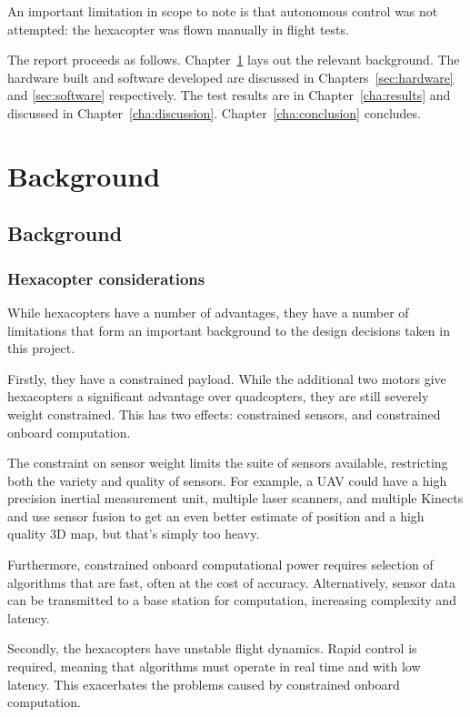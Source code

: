 \documentclass[12pt,oneside,a4paper,draft]{book}
\begin{document}
An important limitation in scope to note is that autonomous control
was not attempted: the hexacopter was flown manually in flight tests.

The report proceeds as follows. 
Chapter~\ref{cha:background} lays out the relevant background. The
hardware built and software developed are discussed in
Chapters~\ref{sec:hardware} and \ref{sec:software} respectively. The
test results are in Chapter~\ref{cha:results} and discussed in
Chapter~\ref{cha:discussion}. Chapter~\ref{cha:conclusion} concludes.

\part{Background}
\chapter{Background}
\label{cha:background}

\section{Hexacopter considerations}
\label{sec:hexac-cons}

While hexacopters have a number of advantages, they have a number of
limitations that form an important background to the design decisions
taken in this project.

Firstly, they have a constrained payload. While the additional two
motors give hexacopters a significant advantage over quadcopters, they
are still severely weight constrained. This has two effects:
constrained sensors, and constrained onboard computation.

The constraint on sensor weight limits the suite of sensors available,
restricting both the variety and quality of sensors. For example, a
UAV could have a high precision inertial measurement unit, multiple
laser scanners, and multiple Kinects and use sensor fusion to get an
even better estimate of position and a high quality 3D map, but that's
simply too heavy.

Furthermore, constrained onboard computational power requires
selection of algorithms that are fast, often at the cost of
accuracy. Alternatively, sensor data can be transmitted to a base
station for computation, increasing complexity and latency.

Secondly, the hexacopters have unstable flight dynamics. Rapid control
is required, meaning that algorithms must operate in real time and
with low latency. This exacerbates the problems caused by constrained
onboard computation.
\end{document}
